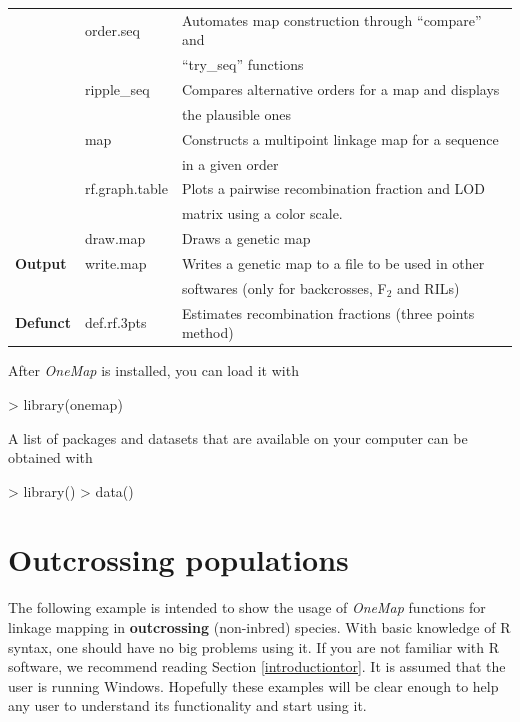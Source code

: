 \documentclass[letterpaper,12pt,oneside]{article}
\begin{document}
\begin{table}[!ht]
\begin{tabular}{lll}
                               & order.seq      & Automates map construction through ``compare'' and \\
                               &                & ``try_seq'' functions \\
                               & ripple_seq     & Compares alternative orders for a map and displays \\ 
                               &                & the plausible ones \\
                               & map            & Constructs a multipoint linkage map for a sequence \\
                               &                & in a given order \\
                               & rf.graph.table & Plots a pairwise recombination fraction and LOD \\  
                               &                & matrix using a color scale. \\
                               & draw.map       & Draws a genetic map \\                     
     \hline
    {\bf Output}            & write.map      & Writes a genetic map to a file to be used in other \\
                               &                & softwares (only for backcrosses, F$_2$ and RILs) \\
    \hline
    {\bf Defunct}          & def.rf.3pts     & Estimates recombination fractions (three points method) \\
    \hline\hline
  \end{tabular}
\end{table}
   
After {\sl OneMap} is installed, you can load it with

\begin{Schunk}
\begin{Sinput}
> library(onemap)
\end{Sinput}
\end{Schunk}

A list of packages and datasets that are available on your computer can be obtained with

\begin{Schunk}
\begin{Sinput}
> library()
> data()
\end{Sinput}
\end{Schunk}

\section{Outcrossing  populations}
\label{outcrossing}
The following example is intended to show the usage of {\sl OneMap} functions for linkage mapping in {\bf outcrossing} (non-inbred) species. With basic knowledge of R syntax, one should have no big problems using it. If you are not familiar with R software, we recommend reading Section \ref{introductiontor}. It is assumed that the user is running Windows\texttrademark. Hopefully these examples will be clear enough to help any user to understand its functionality and start using it.
\end{document}
